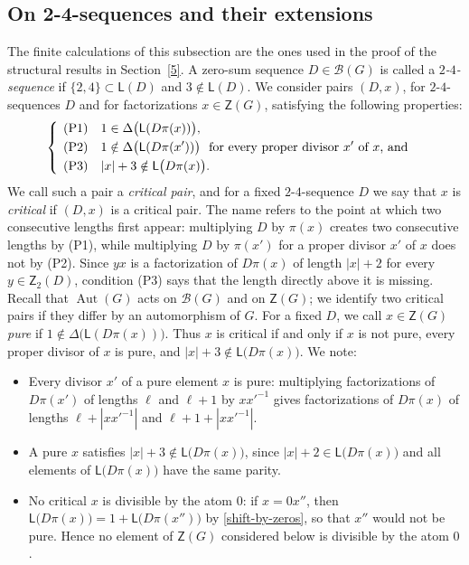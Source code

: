 \documentclass[a4paper, 10pt]{amsart}
\theoremstyle{plain}
\theoremstyle{definition}
\theoremstyle{definition}
\DeclareMathOperator{\Aut}{Aut} \DeclareMathOperator{\GL}{GL}
\numberwithin{equation}{section}
\begin{document}
\subsection{On 2-4-sequences and their extensions}\label{sec:software:carriers}

The finite calculations of this subsection are the ones used in the proof of
the structural results in Section~\ref{5}.  A zero-sum sequence
$D \in \mathcal B (G)$ is called a \emph{$2$-$4$-sequence} if $\{2,4\} \subset \mathsf L (D)$ and 
$3 \notin \mathsf L (D)$.  
We consider pairs $(D,x)$, for $2$-$4$-sequences $D$ and for factorizations $x\in \mathsf Z(G)$,  satisfying the following properties:
\begin{equation}\label{eq:carrier-extension-state}
 \begin{cases}
 \begin{aligned}\hspace{1ex}
  &\text{(P1)} && 1 \in \Delta \bigl(\mathsf L (D\pi(x))\bigr) ,\\
  &\text{(P2)} && 1 \notin \Delta \bigl(\mathsf L (D\pi(x'))\bigr) \ \text{ for every proper divisor $x'$ of $x$, and}\\
  &\text{(P3)} && |x|+3 \notin \mathsf L \big(D\pi(x) \big) .
 \end{aligned}
\end{cases}
\end{equation}
We call such a pair a \emph{critical pair}, and for a fixed $2$-$4$-sequence
$D$ we say that $x$ is \emph{critical} if $(D,x)$ is a critical pair.  The
name refers to the point at which two consecutive lengths first appear:
multiplying $D$ by $\pi(x)$ creates two consecutive lengths by (P1), while
multiplying $D$ by $\pi(x')$ for a proper divisor $x'$ of $x$ does not by (P2).
Since $yx$ is a factorization of $D\pi(x)$ of length $|x|+2$ for every
$y \in \mathsf Z_2 (D)$, condition (P3) says that the length directly above
it is missing.  Recall that $\Aut (G)$ acts on $\mathcal B (G)$ and on
$\mathsf Z (G)$; we identify two critical pairs if they differ by an
automorphism of $G$.  For a fixed $D$, we call $x \in \mathsf Z (G)$
\emph{pure} if $1 \notin \Delta \big( \mathsf L ( D\pi(x) )\big)$.  Thus $x$ is
critical if and only if $x$ is not pure, every proper divisor of $x$ is pure,
and $|x|+3 \notin \mathsf L \big( D\pi(x) \big)$.  We note:
\begin{itemize}
\item Every divisor $x'$ of a pure element $x$ is pure: multiplying
      factorizations of $D\pi(x')$ of lengths $\ell$ and $\ell+1$ by
      $xx'^{-1}$ gives factorizations of $D\pi(x)$ of lengths
      $\ell + |xx'^{-1}|$ and $\ell+1+|xx'^{-1}|$.
\item A pure $x$ satisfies $|x|+3 \notin \mathsf L \big( D\pi(x) \big)$, since
      $|x|+2 \in \mathsf L \big( D\pi(x) \big)$ and all elements of
      $\mathsf L \big( D\pi(x) \big)$ have the same parity.
\item No critical $x$ is divisible by the atom $0$: if $x = 0x''$, then
      $\mathsf L \big( D\pi(x) \big) = 1 + \mathsf L \big( D\pi(x'') \big)$ by
      \eqref{shift-by-zeros}, so that $x''$ would not be pure.  Hence no
      element of $\mathsf Z (G)$ considered below is divisible by the atom $0$.
\end{itemize}
\end{document}
